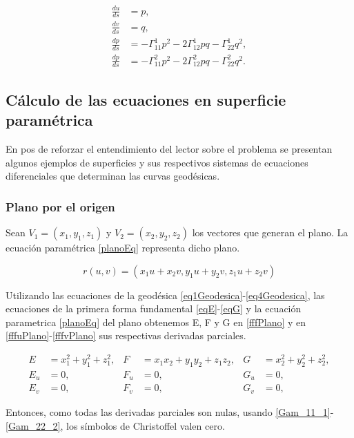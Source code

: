 \documentclass{endm}
\begin{document}
\begin{align} 
\frac{du}{ds}&=p, \label{eq1Geodesica}\\
\frac{dv}{ds}&=q, \label{eq2Geodesica}    \\
\frac{dp}{ds}&= - \Gamma_{11}^1 p^2 -2 \Gamma_{12}^1 pq - \Gamma_{22}^1 q^2, \label{eq3Geodesica}\\ 
\frac{dp}{ds}&=- \Gamma_{11}^2 p^2 -2 \Gamma_{12}^2 pq - \Gamma_{22}^2 q^2. \label{eq4Geodesica}
\end{align}

\subsection{C\'alculo de las ecuaciones en superficie param\'etrica}
En pos de reforzar el entendimiento del lector sobre el problema se presentan algunos ejemplos de superficies y sus respectivos sistemas de ecuaciones diferenciales que determinan las curvas geod\'esicas.

\subsubsection{Plano por el origen}
Sean $V_1=(x_1,y_1,z_1)$ y $V_2=(x_2,y_2,z_2)$ los vectores que generan el plano.
La ecuaci\'on param\'etrica \ref{planoEq} representa dicho plano.

\begin{equation} \label{planoEq}
r(u,v) = (x_1 u + x_2 v, y_1 u + y_2 v, z_1 u + z_2 v)
\end{equation}

Utilizando las ecuaciones de la geod\'esica \ref{eq1Geodesica}-\ref{eq4Geodesica}, las ecuaciones de la primera forma fundamental \ref{eqE}-\ref{eqG} y la ecuaci\'on parametrica \ref{planoEq} del plano obtenemos E, F y G en \ref{fffPlano}  y en \ref{fffuPlano}-\ref{fffvPlano} sus respectivas derivadas parciales.

\begin{align} \label{fffHipEq}
E&=x_1^2 + y_1^2 + z_1^2,   & F &=x_1 x_2 + y_1 y_2 + z_1 z_2,   & G&=x_2^2 + y_2^2 + z_2^2, \label{fffPlano} \\
E_u&=0,     & F_u&=0,   & G_u&=0, \label{fffuPlano}\\
E_v&=0,    & F_v&=0,   & G_v&=0, \label{fffvPlano}
\end{align}

Entonces, como todas las derivadas parciales son nulas, usando \ref{Gam_11_1}-\ref{Gam_22_2}, los s\'imbolos de Christoffel valen cero.
\end{document}
